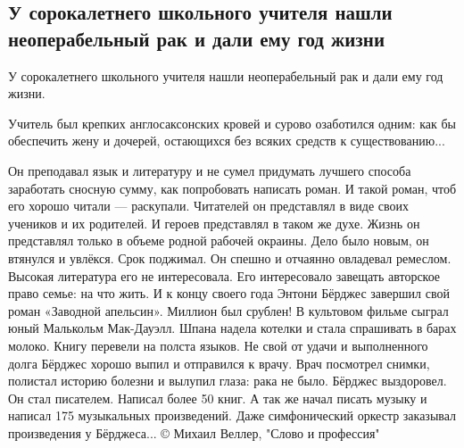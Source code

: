  
 
 
 
 

\subsection{У сорокалетнего школьного учителя нашли неоперабельный рак и дали ему год жизни}

У сорокалетнего школьного учителя нашли неоперабельный рак и дали ему год жизни. 

Учитель был крепких англосаксонских кровей и сурово озаботился одним: как бы
обеспечить жену и дочерей, остающихся без всяких средств к существованию...

Он преподавал язык и литературу и не сумел придумать лучшего способа заработать сносную сумму, как попробовать написать роман. 
И такой роман, чтоб его хорошо читали — раскупали. Читателей он представлял в виде своих учеников и их родителей. 
И героев представлял в таком же духе. Жизнь он представлял только в объеме родной рабочей окраины.
Дело было новым, он втянулся и увлёкся. Срок поджимал. Он спешно и отчаянно овладевал ремеслом. Высокая литература его не интересовала. Его интересовало завещать авторское право семье: на что жить.
И к концу своего года Энтони Бёрджес завершил свой роман «Заводной апельсин». 
Миллион был срублен! 
В культовом фильме сыграл юный Малькольм Мак-Дауэлл. Шпана надела котелки и стала спрашивать в барах молоко. Книгу перевели на полста языков.
Не свой от удачи и выполненного долга Бёрджес хорошо выпил и отправился к врачу. 
Врач посмотрел снимки, полистал историю болезни и вылупил глаза: рака не было. 
Бёрджес выздоровел.
Он стал писателем. 
Написал более 50 книг. 
А так же начал писать музыку и написал 175 музыкальных произведений. Даже симфонический оркестр заказывал произведения у Бёрджеса...
©️ Михаил Веллер, "Слово и профессия"
